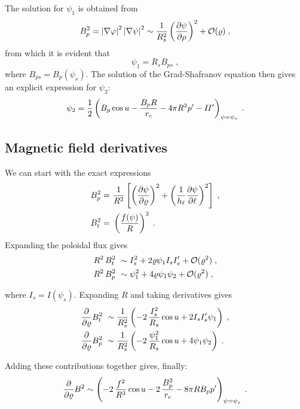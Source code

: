 %
The solution for $\psi_1$ is obtained from 
%
\begin{equation}
B_p^2 = \left|\nabla\varphi\right|^2 \left|\nabla\psi\right|^2 
\sim \frac{1}{R_s^2} \left(\frac{\partial\psi}{\partial\rho}\right)^2 
+ {\mathcal O}(\varrho) \; ,
\end{equation}
%
from which it is evident that 
%
\begin{equation}
\psi_1 = R_s B_{ps} \; ,
\end{equation}
%
where $B_{ps} = B_p(\psi_s)$.  The solution of the 
Grad-Shafranov equation then gives an explicit expression
for $\psi_2$:
%
\begin{equation}
\psi_2 = \frac{1}{2} \left( B_{p} \cos u - \frac{B_{p}R}{r_c} 
-4\pi R^2 p^\prime - I\hskip -1pt I^\prime \right)_{\psi = \psi_s} \; .
\end{equation}
 
\subsection{Magnetic field derivatives}

We can start with the exact expressions
%
\begin{align}
B_p^2 = &~\frac{1}{R^2} \left[ 
\left( \frac{\partial\psi}{\partial\varrho} \right)^2+
\left( \frac{1}{h_\ell} \frac{\partial\psi}{\partial \ell} 
  \right)^2 \right] \; , \\
B_t^2 = &~\left( \frac{f(\psi)}{R} \right)^2 \; .
\end{align}
%
Expanding the poloidal flux gives 
%
\begin{align}
R^2\,B_t^2 &~\sim I_s^2 + 2 \varrho \psi_1 I_s I_s^\prime 
+ {\mathcal O}(\varrho^2) \; , \\
R^2\,B_p^2 &~\sim \psi_1^2 + 4 \varrho \psi_1 \psi_2 
+ {\mathcal O}(\varrho^2) \; ,
\end{align}

\noindent
where $I_s = I(\psi_s)$.  Expanding $R$ and taking derivatives gives
%
\begin{align}
\frac{\partial}{\partial\varrho} B_t^2 
  &~\sim \frac{1}{R_s^2} \left( -2 \, \frac{I_s^2}{R_s}\cos u + 
2 I_s I_s^\prime \psi_1 \right) \; , \\
\frac{\partial}{\partial\varrho} B_p^2 
  &~\sim  \frac{1}{R_s^2} \left( -2 \, \frac{\psi_1^2}{R_s}\cos u + 
4 \psi_1 \psi_2 \right) \; .
\end{align}

\noindent
Adding these contributions together gives, finally:
%
\begin{equation}
\frac{\partial}{\partial\varrho} B^2 \sim 
\left( -2\,\frac{f^2}{R^3} \cos u - 2\,\frac{B_{p}^2}{r_c} -
8\pi R B_{p} p^\prime \right)_{\psi = \psi_s} \; .
\label{eq.brho}
\end{equation}
 
